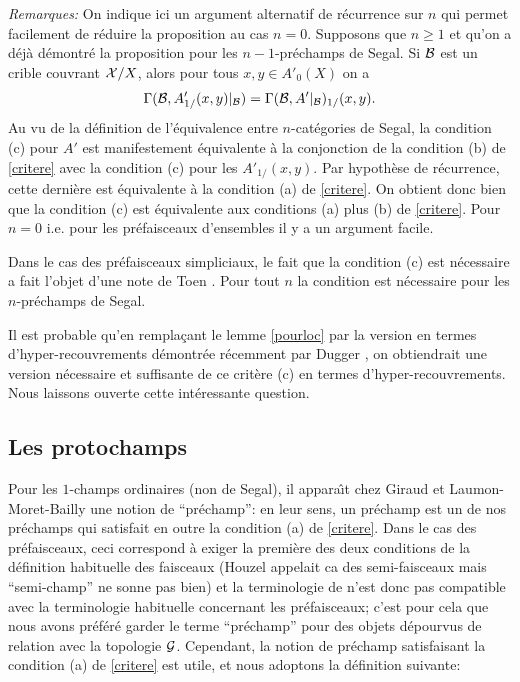 \documentclass[12pt]{article}
\newcommand{\subnumero}[1]{\subsection*{#1}\phantomsection\addcontentsline{toc}{subsection}{#1}}
\newcommand{\Gg}{{\cal G}}
\newcommand{\Bb}{{\cal B}}
\newcommand{\Xx}{{\cal X}}
\begin{document}
{\em Remarques:} On indique ici un argument alternatif de r\'ecurrence sur $n$
qui permet facilement de r\'eduire la proposition au cas $n=0$. Supposons que
$n\geq 1$ et qu'on a d\'ej\`a d\'emontr\'e la proposition pour les
$n-1$-pr\'echamps de Segal. Si $\Bb$ est un crible couvrant $\Xx /X$,
alors
pour tous $x,y\in
A'_0(X)$ on a
$$
\Gamma (\Bb  , A'_{1/}(x,y)|_{\Bb})= \Gamma (\Bb , A'|_{\Bb})_{1/}(x,y).
$$
Au vu de la d\'efinition de l'\'equivalence entre $n$-cat\'egories de Segal,
la condition (c) pour $A'$ est manifestement \'equivalente \`a la
conjonction de la condition
(b) de \ref{critere} avec la condition (c) pour les $A'_{1/}(x,y)$. Par
hypoth\`ese de r\'ecurrence, cette derni\`ere est \'equivalente \`a la condition
(a) de \ref{critere}. On obtient donc bien que la condition (c) est
\'equivalente aux
conditions (a) plus (b) de \ref{critere}.
Pour $n=0$ i.e. pour les pr\'efaisceaux d'ensembles il y a un argument facile. 


Dans le cas des pr\'efaisceaux simpliciaux, 
le fait que la condition (c) est n\'ecessaire
a fait l'objet d'une note de Toen \cite{ToenDescente}.
Pour tout $n$ la condition est n\'ecessaire pour les $n$-pr\'echamps de Segal.

Il est probable qu'en rempla\c{c}ant le lemme \ref{pourloc} par
la version  en termes d'hyper-recouvrements
d\'emontr\'ee r\'ecemment par Dugger \cite{Dugger}, 
on obtiendrait une version n\'e\-ces\-saire et suffisante de ce
crit\`ere (c) en termes d'hyper-recouvrements. Nous laissons
ouverte cette int\'eressante question.





\subnumero{Les protochamps}

Pour les $1$-champs ordinaires (non de Segal), il appara\^{\i}t chez
Giraud \cite{GiraudThese} et Laumon-Moret-Bailly \cite{LaumonMB}
une notion de ``pr\'echamp'': en leur sens, un pr\'echamp
est un de nos pr\'echamps qui satisfait en outre la condition (a) de
\ref{critere}. Dans le cas des pr\'efaisceaux, ceci correspond \`a exiger la
premi\`ere des deux conditions de la d\'efinition habituelle des faisceaux
(Houzel appelait ca des semi-faisceaux mais ``semi-champ'' ne sonne pas bien) et
la terminologie de \cite{GiraudThese} \cite{LaumonMB} n'est donc pas compatible
avec la terminologie habituelle concernant les pr\'efaisceaux;
c'est pour cela que nous avons pr\'ef\'er\'e garder le terme
``pr\'echamp'' pour des objets d\'epourvus de relation avec la topologie $\Gg$.
Cependant, la notion de pr\'echamp satisfaisant la condition (a) de
\ref{critere} est utile, et nous adoptons la d\'efinition
suivante:
\end{document}
